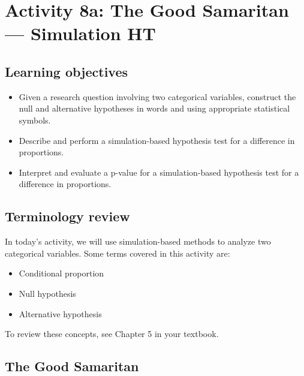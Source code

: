 \documentclass[
]{report}
\begin{document}
\newpage

\hypertarget{activity-8a-the-good-samaritan-simulation-ht}{%
\section{Activity 8a: The Good Samaritan --- Simulation HT}\label{activity-8a-the-good-samaritan-simulation-ht}}


\hypertarget{learning-objectives-10}{%
\subsection{Learning objectives}\label{learning-objectives-10}}

\begin{itemize}
\item
  Given a research question involving two categorical variables, construct the null and alternative hypotheses
  in words and using appropriate statistical symbols.
\item
  Describe and perform a simulation-based hypothesis test for a difference in proportions.
\item
  Interpret and evaluate a p-value for a simulation-based hypothesis test for a difference in proportions.
\end{itemize}

\hypertarget{terminology-review-12}{%
\subsection{Terminology review}\label{terminology-review-12}}

In today's activity, we will use simulation-based methods to analyze two categorical variables. Some terms covered in this activity are:

\begin{itemize}
\item
  Conditional proportion
\item
  Null hypothesis
\item
  Alternative hypothesis
\end{itemize}

To review these concepts, see Chapter 5 in your textbook.

\hypertarget{the-good-samaritan}{%
\subsection{The Good Samaritan}\label{the-good-samaritan}}
\end{document}
